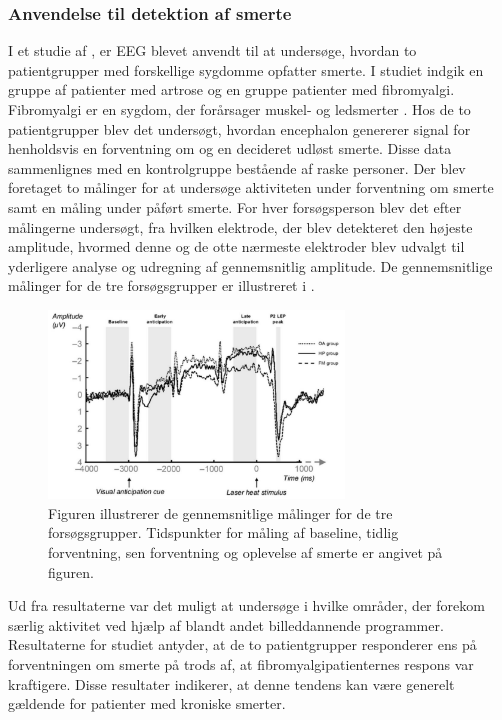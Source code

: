 \subsubsection{Anvendelse til detektion af smerte}
I et studie af , er EEG blevet anvendt til at undersøge, hvordan to patientgrupper med forskellige sygdomme opfatter smerte. I studiet indgik en gruppe af patienter med artrose og en gruppe patienter med fibromyalgi. Fibromyalgi er en sygdom, der forårsager muskel- og ledsmerter \citep{9}. Hos de to patientgrupper blev det undersøgt, hvordan encephalon genererer signal for henholdsvis en forventning om og en decideret udløst smerte. Disse data sammenlignes med en kontrolgruppe bestående af raske personer. Der blev foretaget to målinger for at undersøge aktiviteten under forventning om smerte samt en måling under påført smerte. For hver forsøgsperson blev det efter målingerne undersøgt, fra hvilken elektrode, der blev detekteret den højeste amplitude, hvormed denne og de otte nærmeste elektroder blev udvalgt til yderligere analyse og udregning af gennemsnitlig amplitude. De gennemsnitlige målinger for de tre forsøgsgrupper er illustreret i .
\begin{figure}[H] 
	\begin{center}
		\includegraphics[width=0.7\textwidth]{figures/bProblemanalyse/EEG_ERP}
	\end{center}
	\caption{Figuren illustrerer de gennemsnitlige målinger for de tre forsøgsgrupper. Tidspunkter for måling af baseline, tidlig forventning, sen forventning og oplevelse af smerte er angivet på figuren. \citep{Brown2013}} 
	\label{fig:EEG_gns} 
\end{figure} 

Ud fra resultaterne var det muligt at undersøge i hvilke områder, der forekom særlig aktivitet ved hjælp af blandt andet billeddannende programmer. Resultaterne for studiet antyder, at de to patientgrupper responderer ens på forventningen om smerte på trods af, at fibromyalgipatienternes respons var kraftigere. Disse resultater indikerer, at denne tendens kan være generelt gældende for patienter med kroniske smerter. \citep{Brown2013} 

